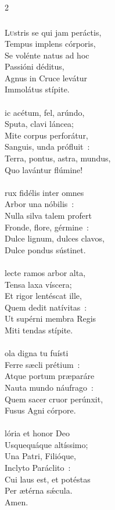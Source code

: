 \documentclass[9pt,twoside]{extarticle}
\begin{document}
\begin{multicols}{2}
\subsubsection*{\center {}}
\lettrine{L}ustris se qui jam peráctis,\\
Tempus implens córporis,\\
Se volénte natus ad hoc\\
Passióni déditus,\\
Agnus in Cruce levátur\\
Immolátus stípite.\\
\\
ic acétum, fel, arúndo,\\
Sputa, clavi láncea;\\
Mite corpus perforátur,\\
Sanguis, unda prófluit~:\\
Terra, pontus, astra, mundus,\\
Quo lavántur flúmine!\\
\\
rux fidélis inter omnes\\
Arbor una nóbilis~:\\
Nulla silva talem profert\\
Fronde, flore, gérmine~:\\
Dulce lignum, dulces clavos,\\
Dulce pondus sústinet.\\
\\
lecte ramos arbor alta,\\
Tensa laxa víscera;\\
Et rigor lentéscat ille,\\
Quem dedit natívitas~:\\
Ut supérni membra Regis\\
Miti tendas stípite.\\
\\
ola digna tu fuísti\\
Ferre sæcli prétium~:\\
Atque portum præparáre\\
Nauta mundo náufrago~:\\
Quem sacer cruor perúnxit,\\
Fusus Agni córpore.\\
\\
lória et honor Deo\\
Usquequáque altíssimo;\\
Una Patri, Filióque,\\
Inclyto Paráclito~:\\
Cui laus est, et potéstas\\
Per ætérna sǽcula.\\
Amen.


\end{multicols}
\end{document}
